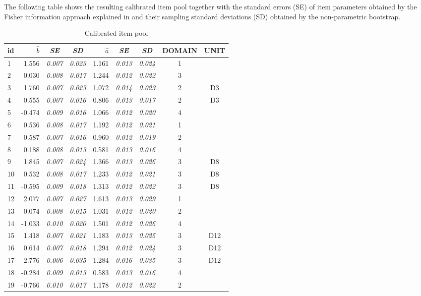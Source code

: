 The following table shows the resulting calibrated item pool together with the standard errors (SE) of item parameters obtained by the Fisher information approach explained in \textcite{seIRT} and their sampling standard deviations (SD) obtained by the non-parametric bootstrap.

\begin{table}[H]
	\small
	\def\arraystretch{0.8}
	\caption{Calibrated item pool}
	\centering
	\begin{tabular}{l r >{\em}c >{\em}c r >{\em}c >{\em}c cc}
		\toprule
		id & $\hat{b}$ & SE & SD & $\hat{a}$ & SE & SD & DOMAIN & UNIT \\
		\midrule
		1&1.556 & {0.007} & 0.023 & 1.161 & 0.013 & 0.024 & 1 & \\ 
		2&0.030 & {0.008}& {0.017} & 1.244 & {0.012}& {0.022} & 3 & \\
		3&1.760 & 0.007 & 0.023 & 1.072 & 0.014 & 0.023 & 2 & D3 \\
		4&0.555 & 0.007 & 0.016 & 0.806 & 0.013 & 0.017 & 2 & D3\\
		5&-0.474 & 0.009 & 0.016 & 1.066 & 0.012 & 0.020 & 4 & \\
		6&0.536 & 0.008 & 0.017 & 1.192 & 0.012 & 0.021 & 1 & \\
		7&0.587 & 0.007 & 0.016 & 0.960 & 0.012 & 0.019 & 2 & \\
		8&0.188 & 0.008 & 0.013 & 0.581 & 0.013 & 0.016 & 4 & \\
		9&1.845 & 0.007 & 0.024 & 1.366 & 0.013 & 0.026 & 3 & D8\\
		10&0.532 & 0.008 & 0.017 & 1.233 & 0.012 & 0.021 & 3 & D8\\
		11&-0.595 & 0.009 & 0.018 & 1.313 & 0.012 & 0.022 & 3 & D8\\
		12&2.077 & 0.007 & 0.027 & 1.613 & 0.013 & 0.029 & 1 & \\
		13&0.074 & 0.008 & 0.015 & 1.031 & 0.012 & 0.020 & 2 & \\
		14&-1.033 & 0.010 & 0.020 & 1.501 & 0.012 & 0.026 & 4 & \\
		15&1.418 & 0.007 & 0.021 & 1.183 & 0.013 & 0.025 & 3 & D12\\
		16&0.614 & 0.007 & 0.018 & 1.294 & 0.012 & 0.024 & 3 & D12\\
		17&2.776 & 0.006 & 0.035 & 1.284 & 0.016 & 0.035 & 3 & D12\\
		18&-0.284 & 0.009 & 0.013 & 0.583 & 0.013 & 0.016 & 4 & \\
		19&-0.766 & 0.010 & 0.017 & 1.178 & 0.012 & 0.022 & 2 & \\

\end{tabular}
\end{table}

